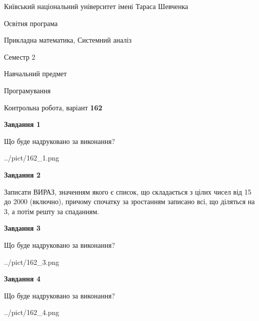 \documentclass[12pt, ukrainian]{article}
\begin{document}
{{\begin {small}\par
{ \center  Київський національний університет імені Тараса Шевченка \par}
{\parbox {5 cm}{Освітня програма \hfill}{\parbox {8 cm}{Прикладна математика, Системний аналіз \hfill}}\parbox {5 cm}{\hfill Семестр 2}}\par
{\parbox {5 cm} {Навчальний предмет \hfill}\parbox {7 cm}{Програмування \hfill}\parbox {6cm}{\hfill}\par}\vspace{-7pt} \end{small}}{\center Контрольна робота, варіант  \No \textbf
{ 162 }\par}}
{
\begin {large}
{\begin {center}\textbf{Завдання 1}\end {center}}\par
Що буде надруковано за виконання?\par\par
\begin{center}
	{../pict/162_1.png}
\end{center}
\newpage

{\begin {center}\textbf{Завдання 2}\end {center}}\par

Записати ВИРАЗ, значенням якого є список, що складається з цілих чисел від 15 до 2000 (включно), причому спочатку за зростанням записано всі, що діляться на 3, а потім решту за спаданням.\par
\newpage

{\begin {center}\textbf{Завдання 3}\end {center}}\par
Що буде надруковано за виконання?
\begin{center}
	{../pict/162_3.png}
\end{center}
\newpage

{\begin {center}\textbf{Завдання 4}\end {center}}\par
Що буде надруковано за виконання?\par
\begin{center}
	{../pict/162_4.png}
\end{center}
\newpage


\end{large}}
\end{document}
